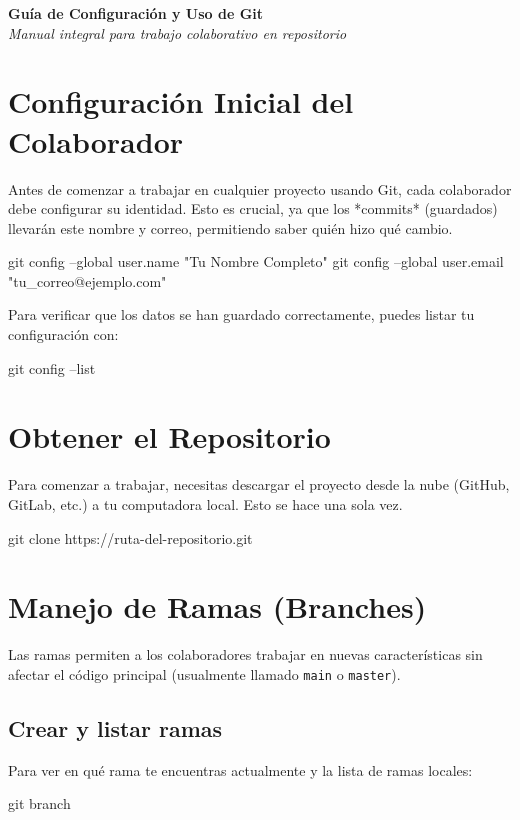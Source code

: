 \documentclass[letterpaper,12pt,oneside]{article}
\begin{document}
\begin{center}
    {\Huge \textbf{Guía de Configuración y Uso de Git}}\\
    \vspace{0.5cm}
    {\large \textit{Manual integral para trabajo colaborativo en repositorio}}
\end{center}

\vspace{1cm}

\section{Configuración Inicial del Colaborador}
Antes de comenzar a trabajar en cualquier proyecto usando Git, cada colaborador debe configurar su identidad. Esto es crucial, ya que los *commits* (guardados) llevarán este nombre y correo, permitiendo saber quién hizo qué cambio.

\begin{gitbox}
git config --global user.name "Tu Nombre Completo"
git config --global user.email "tu_correo@ejemplo.com"
\end{gitbox}

Para verificar que los datos se han guardado correctamente, puedes listar tu configuración con:
\begin{gitbox}[]
git config --list
\end{gitbox}

\section{Obtener el Repositorio}
Para comenzar a trabajar, necesitas descargar el proyecto desde la nube (GitHub, GitLab, etc.) a tu computadora local. Esto se hace una sola vez.

\begin{gitbox}
git clone https://ruta-del-repositorio.git
\end{gitbox}

\section{Manejo de Ramas (Branches)}
Las ramas permiten a los colaboradores trabajar en nuevas características sin afectar el código principal (usualmente llamado \texttt{main} o \texttt{master}).

\subsection{Crear y listar ramas}
Para ver en qué rama te encuentras actualmente y la lista de ramas locales:
\begin{gitbox}[]
git branch
\end{gitbox}
\end{document}
